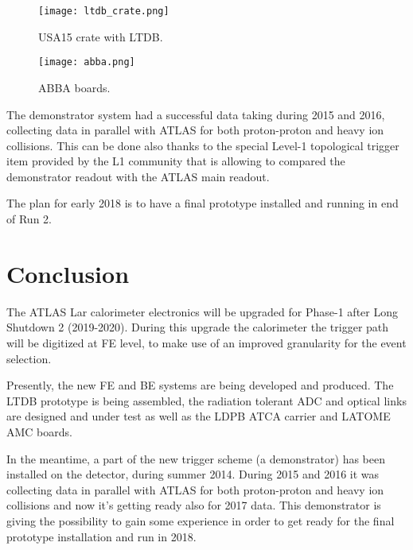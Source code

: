 \documentclass{llncs}
\begin{document}
\begin{figure}[ht]
\begin{minipage}[l]{0.5\textwidth}
	\centering
	\texttt{[image: ltdb\_crate.png]}
	\caption{USA15 crate with LTDB.}
	\label{fig:demo_ltdb}
\end{minipage}
\begin{minipage}[r]{0.47\textwidth}
	\texttt{[image: abba.png]}
	\caption{ABBA boards.}
	\label{fig:abba}
\end{minipage}
\end{figure}

The demonstrator system had a successful data taking during 2015 and 2016, collecting data in parallel with ATLAS for both proton-proton and heavy ion collisions. This can be done also thanks to the special Level-1 topological trigger item provided by the L1 community that is allowing to compared the demonstrator readout with the ATLAS main readout.

The plan for early 2018 is to have a final prototype installed and running in end of Run 2.

\section{Conclusion}
The ATLAS Lar calorimeter electronics will be upgraded for Phase-1 after Long Shutdown 2 (2019-2020). During this upgrade the calorimeter the trigger path will be digitized at FE level, to make use of an improved granularity for the event selection.

Presently, the new FE and BE systems are being developed and produced. The LTDB prototype is being assembled, the radiation tolerant ADC and optical links are designed and under test as well as the LDPB ATCA carrier and LATOME AMC boards. 

In the meantime, a part of the new trigger scheme (a demonstrator) has been installed on the detector, during summer 2014. During 2015 and 2016 it was collecting data in parallel with ATLAS for both proton-proton and heavy ion collisions and now it's getting ready also for 2017 data. This demonstrator is giving the possibility to gain some experience in order to get ready for the final prototype installation and run in 2018.



\end{document}
